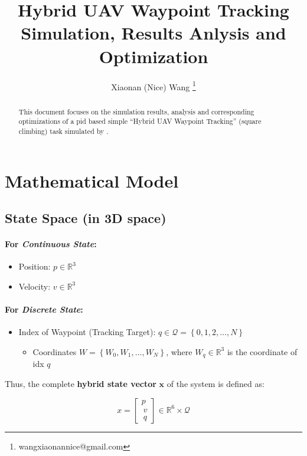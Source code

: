 \documentclass{article}
\title{Hybrid UAV Waypoint Tracking Simulation, Results Anlysis and Optimization}
\author{
  Xiaonan (Nice) Wang \thanks{wangxiaonannice@gmail.com} \\
}
\begin{document}
\newcommand{\repeatfootnote}[1]{\textsuperscript{\ref{#1}}}

\maketitle

\begin{abstract}
This document focuses on the simulation results, analysis and corresponding optimizations of a pid based simple ``Hybrid UAV Waypoint Tracking'' (square climbing) task simulated by \cite{panerati2021learning}.
\end{abstract}

\section{Mathematical Model}
\subsection{State Space (in 3D space)}
                           
\paragraph{For \textit{Continuous State}:} 
\begin{itemize}
  \item Position: $p\in\mathbb{R}^3$
  \item Velocity: $v\in\mathbb{R}^3$
\end{itemize}

\paragraph{For \textit{Discrete State}:}
\begin{itemize}
  \item Index of Waypoint (Tracking Target): $q\in\mathcal{Q}=\left\lbrace 0,1,2,\dots,N \right\rbrace$
  \begin{itemize}
    \item Coordinates $W=\left\lbrace W_0,W_1,\dots,W_N \right\rbrace$, where $W_q\in\mathbb{R}^3$ is the coordinate of idx $q$
  \end{itemize}
\end{itemize}

Thus, the complete \textbf{hybrid state vector} $\bm{x}$ of the system is defined as:

\begin{equation}
  x = \begin{bmatrix} p \\\ v \\\ q \end{bmatrix} \in \mathbb{R}^6 \times \mathcal{Q}
\end{equation}
\end{document}
